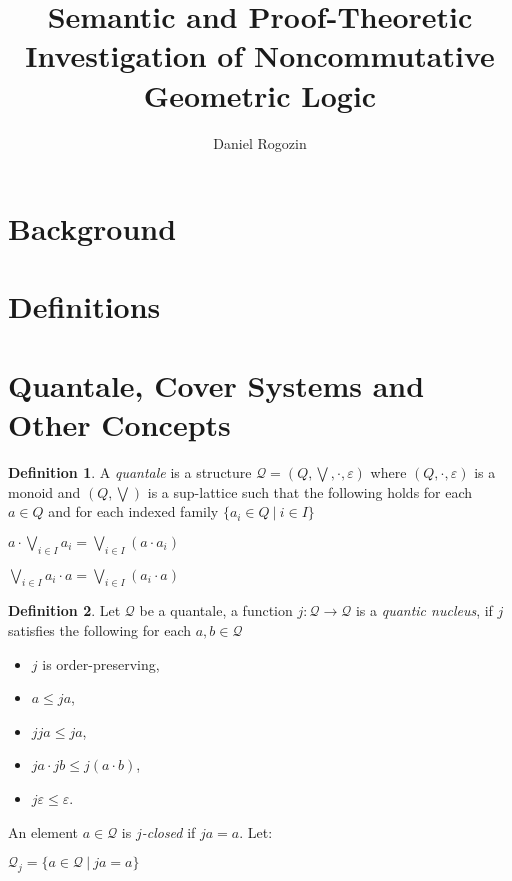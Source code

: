 \documentclass[8pt]{article}
\title{Semantic and Proof-Theoretic Investigation of Noncommutative Geometric Logic}
\author{Daniel Rogozin}
\date{ }
\theoremstyle{definition}
\newtheorem{definition}{Definition}[section]
\theoremstyle{definition}
\theoremstyle{definition}
\theoremstyle{definition}
\theoremstyle{definition}
\theoremstyle{definition}
\theoremstyle{definition}
\theoremstyle{definition}
\theoremstyle{definition}
\theoremstyle{definition}
\theoremstyle{definition}
\theoremstyle{definition}
\theoremstyle{definition}
\theoremstyle{question}
\begin{document}
\maketitle

\section{Background}

\section{Definitions}

\section{Quantale, Cover Systems and Other Concepts}

\begin{definition}
  A \emph{quantale} is a structure $\mathcal{Q} = (Q, \bigvee, \cdot, \varepsilon)$
  where $(Q, \cdot, \varepsilon)$ is a monoid and $(Q, \bigvee)$ is a sup-lattice such that the following holds
  for each $a \in Q$ and for each indexed family $\{ a_i \in Q \: | \: i \in I \}$
  \begin{center}
    $a \cdot \bigvee \limits_{i \in I} a_i = \bigvee \limits_{i \in I} (a \cdot a_i)$

    $\bigvee \limits_{i \in I} a_i \cdot a = \bigvee \limits_{i \in I} (a_i \cdot a)$
  \end{center}
\end{definition}

\begin{definition}
Let $\mathcal{Q}$ be a quantale, a function $j : \mathcal{Q} \to \mathcal{Q}$ is a \emph{quantic nucleus},
if $j$ satisfies the following for each $a, b \in \mathcal{Q}$
\begin{itemize}
  \item $j$ is order-preserving,
  \item $a \leq j a$,
  \item $j j a \leq j a$,
  \item $j a \cdot j b \leq j (a \cdot b)$,
  \item $j \varepsilon \leq \varepsilon$.
\end{itemize}
An element $a \in \mathcal{Q}$ is \emph{$j$-closed} if $j a = a$. Let:
\begin{center}
$\mathcal{Q}_j = \{ a \in \mathcal{Q} \: | \: j a = a \}$
\end{center}
\end{definition}
\end{document}
